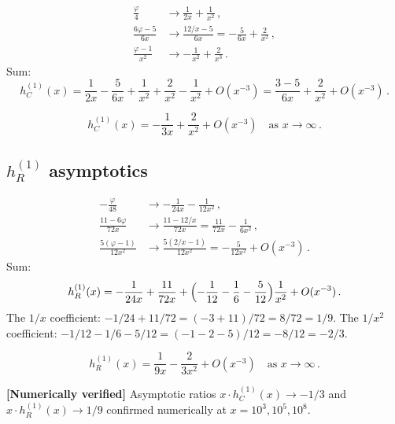 \documentclass[11pt,a4paper]{article}
\theoremstyle{definition}
\theoremstyle{remark}
\newcommand{\verified}[1]{%
  \par\noindent\colorbox{green!10}{%
    \parbox{\dimexpr\linewidth-2\fboxsep}{%
      \textcolor{green!50!black}{\textbf{[Numerically verified]}}
      \textcolor{green!50!black}{#1}%
    }%
  }\par%
}
\begin{document}
\begin{align*}
  \frac{\varphi}{4} &\to \frac{1}{2x} + \frac{1}{x^2}\,,\\
  \frac{6\varphi-5}{6x} &\to \frac{12/x - 5}{6x}
  = -\frac{5}{6x} + \frac{2}{x^2}\,,\\
  \frac{\varphi-1}{x^2} &\to -\frac{1}{x^2}
  + \frac{2}{x^3}\,.
\end{align*}
Sum:
\begin{equation}
  h_C^{(1)}(x) = \frac{1}{2x} - \frac{5}{6x}
  + \frac{1}{x^2} + \frac{2}{x^2} - \frac{1}{x^2} + O(x^{-3})
  = \frac{3-5}{6x} + \frac{2}{x^2} + O(x^{-3})\,.
\end{equation}

\begin{equation}
  \boxed{h_C^{(1)}(x) = -\frac{1}{3x} + \frac{2}{x^2}
  + O(x^{-3})
  \quad\text{as } x \to \infty\,.}
  \label{eq:hC-asymp}
\end{equation}


\subsection{$h_R^{(1)}$ asymptotics}

\begin{align*}
  -\frac{\varphi}{48} &\to -\frac{1}{24x} - \frac{1}{12x^2}\,,\\
  \frac{11-6\varphi}{72x} &\to \frac{11-12/x}{72x}
  = \frac{11}{72x} - \frac{1}{6x^2}\,,\\
  \frac{5(\varphi-1)}{12x^2} &\to
  \frac{5(2/x-1)}{12x^2}
  = -\frac{5}{12x^2} + O(x^{-3})\,.
\end{align*}
Sum:
\begin{equation}
  h_R^{(1)}(x) = -\frac{1}{24x} + \frac{11}{72x}
  + \Bigl(-\frac{1}{12} - \frac{1}{6} - \frac{5}{12}\Bigr)\frac{1}{x^2}
  + O(x^{-3})\,.
\end{equation}
The $1/x$ coefficient: $-1/24 + 11/72 = (-3+11)/72 = 8/72 = 1/9$.
The $1/x^2$ coefficient: $-1/12 - 1/6 - 5/12 = (-1-2-5)/12 = -8/12 = -2/3$.

\begin{equation}
  \boxed{h_R^{(1)}(x) = \frac{1}{9x} - \frac{2}{3x^2}
  + O(x^{-3})
  \quad\text{as } x \to \infty\,.}
  \label{eq:hR-asymp}
\end{equation}

\verified{Asymptotic ratios $x\cdot h_C^{(1)}(x) \to -1/3$ and
$x\cdot h_R^{(1)}(x) \to 1/9$ confirmed numerically at
$x = 10^3, 10^5, 10^8$.}


\end{document}
